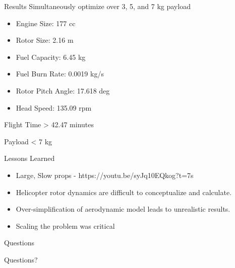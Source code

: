 \documentclass{beamer}
\begin{document}
\begin{frame}{Results}
	Simultaneously optimize over 3, 5, and 7 kg payload
	\begin{itemize}
		\item{Engine Size: 177 cc} 
		\item{Rotor Size: 2.16 m}
		\item{Fuel Capacity: 6.45 kg}
		\item{Fuel Burn Rate: 0.0019 kg/s}
		\item{Rotor Pitch Angle: 17.618 deg}
		\item{Head Speed: 135.09 rpm}
	\end{itemize}
	
	Flight Time > 42.47 minutes
	
	Payload < 7 kg
\end{frame}

\begin{frame}{Lessons Learned}
	\begin{itemize}
		\item{Large, Slow props - https://youtu.be/syJq10EQkog?t=7s}
		\item{Helicopter rotor dynamics are difficult to conceptualize and calculate.}
		\item{Over-simplification of aerodynamic model leads to unrealistic results.}
		\item{Scaling the problem was critical}	
	\end{itemize}
\end{frame}

\begin{frame}{Questions}
	
		\begin{center}
			Questions?
		\end{center}
	
\end{frame}
\end{document}
